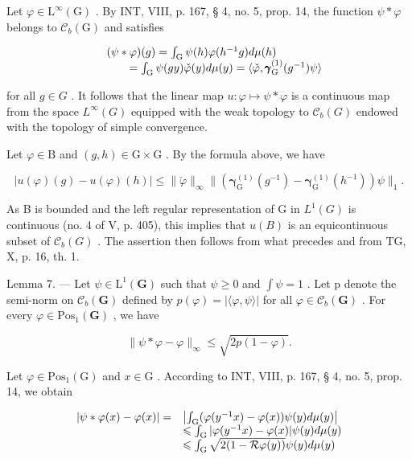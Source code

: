 Let \(\varphi\in\mathrm{L}^{\infty}(\mathrm{G})\) . By INT, VIII, p. 167, § 4, no. 5, prop. 14, the function \(\psi*\varphi\) belongs to \(\mathcal{C}_{b}(\mathrm{G})\) and satisfies

\[
\begin{array}{r l} & {(\psi * \varphi) (g) = \int_ {\mathrm{G}} \psi (h) \varphi (h ^ {- 1} g) d \mu (h)} \\ & {\qquad = \int_ {\mathrm{G}} \psi (g y) \check {\varphi} (y) d \mu (y) = \langle \check {\varphi}, \pmb {\gamma} _ {\mathrm{G}} ^ {(1)} (g ^ {- 1}) \psi \rangle} \end{array}
\]

for all \(g \in G\) . It follows that the linear map \(u: \varphi \mapsto \psi * \varphi\) is a continuous map from the space \(L^{\infty}(G)\) equipped with the weak topology to \(\mathcal{C}_{b}(G)\) endowed with the topology of simple convergence.

Let \(\varphi\in\mathrm{B}\) and \((g,h)\in\mathrm{G}\times\mathrm{G}\) . By the formula above, we have

\[
| u (\varphi) (g) - u (\varphi) (h) | \leqslant \| \check {\varphi} \| _ {\infty} \| (\boldsymbol {\gamma} _ {\mathrm{G}} ^ {(1)} (g ^ {- 1}) - \boldsymbol {\gamma} _ {\mathrm{G}} ^ {(1)} (h ^ {- 1})) \psi \| _ {1}.
\]

As B is bounded and the left regular representation of G in \(L^{1}(G)\) is continuous (no. 4 of V, p. 405), this implies that \(u(B)\) is an equicontinuous subset of \(\mathcal{C}_{b}(G)\) . The assertion then follows from what precedes and from TG, X, p. 16, th. 1.

Lemma 7. --- Let \(\psi \in \mathrm{L}^1 (\mathbf{G})\) such that \(\psi \geqslant 0\) and \(\int \psi = 1\) . Let p denote the semi-norm on \(\mathcal{C}_b(\mathbf{G})\) defined by \(p(\varphi) = |\langle \varphi ,\psi \rangle |\) for all \(\varphi \in \mathcal{C}_b(\mathbf{G})\) . For every \(\varphi \in \mathrm{Pos}_1(\mathbf{G})\) , we have

\[
\| \psi * \varphi - \varphi \| _ {\infty} \leqslant \sqrt {2 p (1 - \varphi)}.
\]

Let \(\varphi\in\mathrm{Pos}_{1}(\mathrm{G})\) and \(x\in\mathrm{G}\) . According to INT, VIII, p. 167, § 4, no. 5, prop. 14, we obtain

\[
\begin{array}{r l} | \psi * \varphi (x) - \varphi (x) | = & \left| \int_ {\mathrm{G}} (\varphi (y ^ {- 1} x) - \varphi (x)) \psi (y) d \mu (y) \right| \\ & \leqslant \int_ {\mathrm{G}} | \varphi (y ^ {- 1} x) - \varphi (x) | \psi (y) d \mu (y) \\ & \leqslant \int_ {\mathrm{G}} \sqrt {2 (1 - \mathcal {R}   \varphi (y))} \psi (y) d \mu (y) \end{array}
\]

